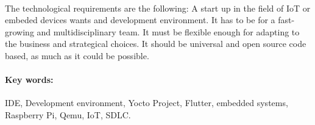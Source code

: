 \paragraph{} The technological requirements are the following: A start up in the field
of IoT or embeded devices wants and development environment. It has to be for a fast-growing
and multidisciplinary team. It must be flexible enough for adapting to the business
and strategical choices. It should be universal and open source code based, as much as
it could be possible.

\paragraph{Key words:} IDE, Development environment, Yocto Project, Flutter, embedded
systems, Raspberry Pi, Qemu, IoT, SDLC.